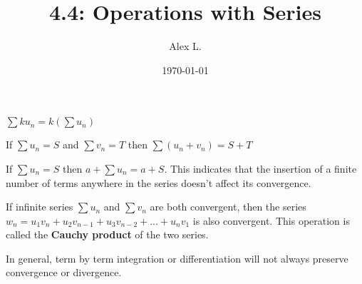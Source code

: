 \documentclass{article}
\title{4.4: Operations with Series}
\author{Alex L.}
\date{\today}
\begin{document}
\maketitle

$\sum ku_n = k(\sum u_n)$

If $\sum u_n = S$ and $\sum v_n = T$ then $\sum(u_n+v_n) = S+T$

If $\sum u_n = S$ then $a+\sum u_n = a+S$. This indicates that the insertion of a finite number of terms anywhere in the series doesn't affect its convergence.

If infinite series $\sum u_n$ and $\sum v_n$ are both convergent, then the series $w_n = u_1v_n + u_2 v_{n-1} + u_3 v_{n-2} + ... + u_n v_1$ is also convergent. This operation is called the \textbf{Cauchy product} of the two series.

In general, term by term integration or differentiation will not always preserve convergence or divergence. 
\end{document}
